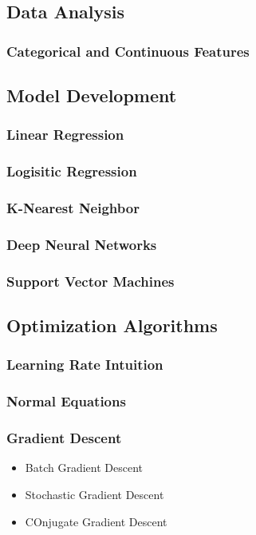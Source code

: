 \documentclass[11pt]{article}
\begin{document}
\subsection{Data Analysis}
\label{sec:orgb22d9c5}
\subsubsection{Categorical and Continuous Features}
\label{sec:orgfa33216}
\subsection{Model Development}
\label{sec:org629f7f2}
\subsubsection{Linear Regression}
\label{sec:org22c2fd6}
\subsubsection{Logisitic Regression}
\label{sec:org07ea41a}
\subsubsection{K-Nearest Neighbor}
\label{sec:org2346001}
\subsubsection{Deep Neural Networks}
\label{sec:orgf23d4b6}
\subsubsection{Support Vector Machines}
\label{sec:orgec48aee}
\subsection{Optimization Algorithms}
\label{sec:orgea54795}
\subsubsection{Learning Rate Intuition}
\label{sec:org57eb424}
\subsubsection{Normal Equations}
\label{sec:org501cdde}
\subsubsection{Gradient Descent}
\label{sec:orge8706c1}
\begin{itemize}
\item Batch Gradient Descent
\item Stochastic Gradient Descent
\item COnjugate Gradient Descent
\end{itemize}
\end{document}
